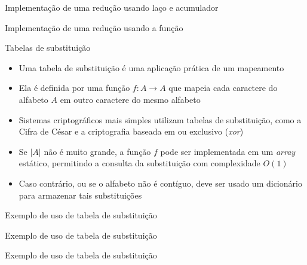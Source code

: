 \begin{frame}[fragile]{Implementação de uma redução usando laço e acumulador}
\end{frame}

\begin{frame}[fragile]{Implementação de uma redução usando a função }
\end{frame}

\begin{frame}[fragile]{Tabelas de substituição}

    \begin{itemize}
        \item Uma tabela de substituição é uma aplicação prática de um mapeamento

        \item Ela é definida por uma função $f: A \to A$ que mapeia cada caractere do alfabeto 
            $A$ em outro caractere do mesmo alfabeto

        \item Sistemas criptográficos mais simples utilizam tabelas de substituição, como a Cifra 
            de César e a criptografia baseada em ou exclusivo (\textit{xor})

        \item Se $|A|$ não é muito grande, a função $f$ pode ser implementada em um \textit{array}
            estático, permitindo a consulta da substituição com complexidade $O(1)$

        \item Caso contrário, ou se o alfabeto não é contíguo, deve ser usado um dicionário para 
            armazenar tais substituições
            
    \end{itemize}

\end{frame}

\begin{frame}[fragile]{Exemplo de uso de tabela de substituição}
\end{frame}

\begin{frame}[fragile]{Exemplo de uso de tabela de substituição}
\end{frame}

\begin{frame}[fragile]{Exemplo de uso de tabela de substituição}
\end{frame}

